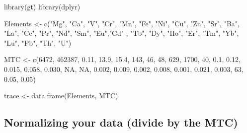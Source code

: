 \documentclass[
  letterpaper,
  DIV=11,
  numbers=noendperiod]{scrreprt}
\newenvironment{Shaded}{\begin{snugshade}}{\end{snugshade}}
\newcommand{\ConstantTok}[1]{\textcolor[rgb]{0.56,0.35,0.01}{#1}}
\newcommand{\DecValTok}[1]{\textcolor[rgb]{0.68,0.00,0.00}{#1}}
\newcommand{\FloatTok}[1]{\textcolor[rgb]{0.68,0.00,0.00}{#1}}
\newcommand{\FunctionTok}[1]{\textcolor[rgb]{0.28,0.35,0.67}{#1}}
\newcommand{\NormalTok}[1]{\textcolor[rgb]{0.00,0.23,0.31}{#1}}
\newcommand{\OtherTok}[1]{\textcolor[rgb]{0.00,0.23,0.31}{#1}}
\newcommand{\StringTok}[1]{\textcolor[rgb]{0.13,0.47,0.30}{#1}}
\begin{document}
\begin{Shaded}
\begin{Highlighting}[]
\FunctionTok{library}\NormalTok{(gt)}
\FunctionTok{library}\NormalTok{(dplyr)}

\NormalTok{Elements }\OtherTok{\textless{}{-}} \FunctionTok{c}\NormalTok{(}\StringTok{"Mg"}\NormalTok{, }\StringTok{"Ca"}\NormalTok{, }\StringTok{"V"}\NormalTok{, }\StringTok{"Cr"}\NormalTok{, }\StringTok{"Mn"}\NormalTok{, }\StringTok{"Fe"}\NormalTok{, }\StringTok{"Ni"}\NormalTok{, }\StringTok{"Cu"}\NormalTok{, }\StringTok{"Zn"}\NormalTok{, }\StringTok{"Sr"}\NormalTok{,}
              \StringTok{"Ba"}\NormalTok{, }\StringTok{"La"}\NormalTok{, }\StringTok{"Ce"}\NormalTok{, }\StringTok{"Pr"}\NormalTok{, }\StringTok{"Nd"}\NormalTok{, }\StringTok{"Sm"}\NormalTok{, }\StringTok{"Eu"}\NormalTok{,}\StringTok{"Gd"}\NormalTok{ , }\StringTok{"Tb"}\NormalTok{, }\StringTok{"Dy"}\NormalTok{,}
              \StringTok{"Ho"}\NormalTok{, }\StringTok{"Er"}\NormalTok{, }\StringTok{"Tm"}\NormalTok{, }\StringTok{"Yb"}\NormalTok{, }\StringTok{"Lu"}\NormalTok{, }\StringTok{"Pb"}\NormalTok{, }\StringTok{"Th"}\NormalTok{, }\StringTok{"U"}\NormalTok{)}

\NormalTok{MTC }\OtherTok{\textless{}{-}} \FunctionTok{c}\NormalTok{(}\DecValTok{6472}\NormalTok{, }\DecValTok{462387}\NormalTok{, }\FloatTok{0.11}\NormalTok{, }\FloatTok{13.9}\NormalTok{, }\FloatTok{15.4}\NormalTok{, }\DecValTok{143}\NormalTok{, }\DecValTok{46}\NormalTok{, }\DecValTok{48}\NormalTok{, }\DecValTok{629}\NormalTok{, }\DecValTok{1700}\NormalTok{,}
         \DecValTok{40}\NormalTok{, }\FloatTok{0.1}\NormalTok{, }\FloatTok{0.12}\NormalTok{, }\FloatTok{0.015}\NormalTok{, }\FloatTok{0.058}\NormalTok{, }\FloatTok{0.030}\NormalTok{, }\ConstantTok{NA}\NormalTok{, }\ConstantTok{NA}\NormalTok{, }\FloatTok{0.002}\NormalTok{, }\FloatTok{0.009}\NormalTok{,}
         \FloatTok{0.002}\NormalTok{, }\FloatTok{0.008}\NormalTok{, }\FloatTok{0.001}\NormalTok{, }\FloatTok{0.021}\NormalTok{, }\FloatTok{0.003}\NormalTok{, }\DecValTok{63}\NormalTok{, }\FloatTok{0.05}\NormalTok{, }\FloatTok{0.05}\NormalTok{)}

\NormalTok{trace }\OtherTok{\textless{}{-}} \FunctionTok{data.frame}\NormalTok{(Elements, MTC)}
\end{Highlighting}
\end{Shaded}

\subsection{Normalizing your data (divide by the
MTC)}\label{normalizing-your-data-divide-by-the-mtc}
\end{document}
